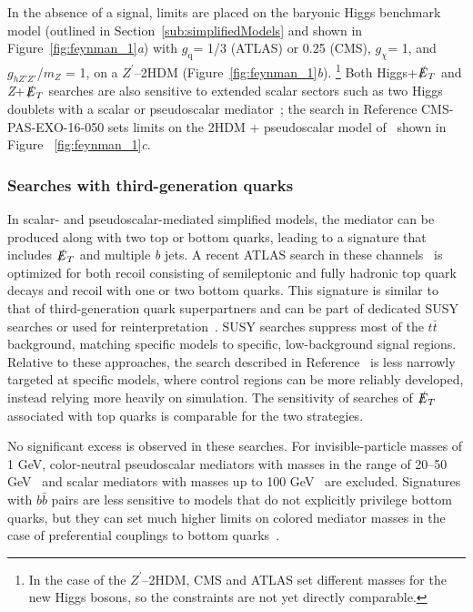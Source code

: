 \documentclass{ar-1col}
\newcommand{\chiDM}{\ensuremath{\chi}\xspace}
\newcommand{\gDM}{\ensuremath{g_{\chiDM}}\xspace}
\newcommand{\gdm}{\gDM}
\newcommand{\gq}{$g_{\mathrm{q}}$\xspace}
\newcommand{\ghZprimeZprime}{\ensuremath{g_{hZ'Z'}}\xspace}
\newcommand{\MET}{\ensuremath{\slashed{E}_T}\xspace}
\newcommand{\Zprime}{\ensuremath{{Z}^\prime}\xspace}
\begin{document}
{In the absence of a signal, limits are placed on the baryonic Higgs benchmark
model (outlined in Section~\ref{sub:simplifiedModels} and shown in Figure~\ref{fig:feynman_1}\textit{a})
with \gq = 1/3 (ATLAS) or 0.25 (CMS), \gdm = 1, and \ghZprimeZprime/$m_{Z}$ = 1, on a
\Zprime--2HDM (Figure~\ref{fig:feynman_1}\textit{b}).
\footnote{In the case of the \Zprime--2HDM, CMS and ATLAS set different masses for the new Higgs
bosons, so the constraints are not yet directly comparable.} 
Both Higgs+\MET and \textit{Z}+\MET searches are also sensitive to extended
scalar sectors such as two Higgs doublets with a scalar or
pseudoscalar mediator~\cite{Bauer:2017ota,Goncalves:2016iyg,Bell:2016ekl};
the search in Reference {CMS-PAS-EXO-16-050} sets limits on the 2HDM + pseudoscalar model of~\cite{Bauer:2017ota}
shown in Figure ~\ref{fig:feynman_1}\textit{c}.

\subsubsection{Searches with third-generation quarks}

In scalar- and pseudoscalar-mediated simplified models, 
the mediator can be produced along with two top or
bottom quarks, leading to a signature that includes \MET and multiple \textit{b} jets.
A recent ATLAS search in these channels~\cite{Aaboud:2017rzf} is
optimized for both recoil consisting of semileptonic and fully
hadronic top quark decays and recoil with one or two bottom
quarks. This signature is similar to that of third-generation
quark superpartners and can be part of dedicated SUSY searches or
used for reinterpretation~\cite{Aaboud:2017aeu,Sirunyan:2017leh}.
SUSY searches suppress most of the $t\bar{t}$ background, matching
specific models to specific, low-background signal regions.
Relative to these approaches, the search described in
Reference~ is less narrowly targeted at specific
models, where control regions can be more reliably developed,
instead relying more heavily on simulation. The sensitivity of
searches of \MET associated with top quarks is comparable for the
two strategies.

No significant excess is observed in these searches. For invisible-particle masses of
1 GeV, color-neutral pseudoscalar mediators with masses in the range of 20--50
GeV~\cite{Aaboud:2017aeu} and scalar mediators with masses up to 100
GeV~\cite{Sirunyan:2017leh} are excluded. Signatures with
$b\bar{b}$ pairs are less sensitive to models that do not
explicitly privilege bottom quarks, but they can set much higher limits
on colored mediator masses in the case of preferential couplings to
bottom quarks~\cite{Agrawal:2014una}.

}
\end{document}
